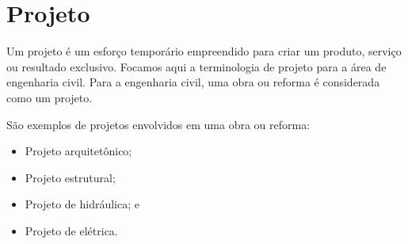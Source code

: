 \chapter{Projeto}
Um projeto é um esforço temporário empreendido para criar um produto, serviço ou resultado exclusivo. Focamos aqui a terminologia de projeto para a área de engenharia civil. Para a engenharia civil, uma obra ou reforma é considerada como um projeto.

São exemplos de projetos envolvidos em uma obra ou reforma:
\begin{itemize}
	\item Projeto arquitetônico;
	\item Projeto estrutural;
	\item Projeto de hidráulica; e
	\item Projeto de elétrica.
\end{itemize}